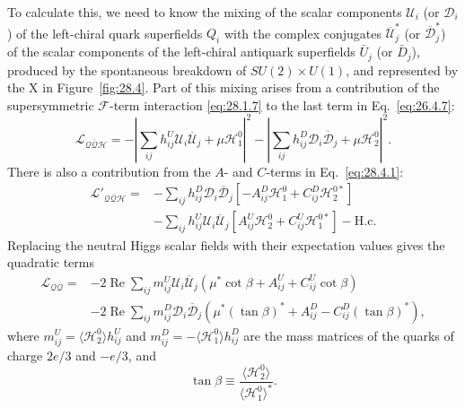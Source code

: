 To calculate this, we need to know the mixing of the scalar components
\(\mathcal{U}_i\) (or \(\mathcal{D}_i\)) of the left-chiral quark
superfields \(Q_i\) with the complex conjugates
\(\overline{\mathcal{U}}_j^*\) (or
\(\overline{\mathcal{D}}_j^*\)) of the scalar components of the
left-chiral antiquark superfields \(\bar U_j\) (or \(\bar D_j\)),
produced by the spontaneous breakdown of
\(SU(2)\times U(1)\), and represented by the X in
Figure~\ref{fig:28.4}. Part of this mixing arises from a contribution of
the supersymmetric \(\mathcal{F}\)-term interaction
\eqref{eq:28.1.7} to the last term in Eq.~\eqref{eq:26.4.7}:
\begin{equation}
  \mathcal{L}_{\mathcal{Q}\overline{\mathcal{Q}}\mathcal{H}}
  =
  -\left|
    \sum_{ij}h_{ij}^{U}\mathcal{U}_i\overline{\mathcal{U}}_j
    +\mu\mathcal{H}_1^0
  \right|^2
  -\left|
    \sum_{ij}h_{ij}^{D}\mathcal{D}_i\overline{\mathcal{D}}_j
    +\mu\mathcal{H}_2^0
  \right|^2.
  \tag{28.4.7}\label{eq:28.4.7}
\end{equation}
There is also a contribution from the \(A\)- and \(C\)-terms in
Eq.~\eqref{eq:28.4.1}:
\begin{equation}
  \begin{aligned}
  \mathcal{L}'_{\mathcal{Q}\overline{\mathcal{Q}}\mathcal{H}}
  ={}&
  -\sum_{ij}h_{ij}^{D}\mathcal{D}_i\overline{\mathcal{D}}_j
  \left[
    -A_{ij}^{D}\mathcal{H}_1^0+C_{ij}^{D}\mathcal{H}_2^{0*}
  \right]
  \\
  &-\sum_{ij}h_{ij}^{U}\mathcal{U}_i\overline{\mathcal{U}}_j
  \left[
    A_{ij}^{U}\mathcal{H}_2^0+C_{ij}^{U}\mathcal{H}_1^{0*}
  \right]
  -\mathrm{H.c.}
  \end{aligned}
  \tag{28.4.8}\label{eq:28.4.8}
\end{equation}
Replacing the neutral Higgs scalar fields with their expectation values
gives the quadratic terms
\begin{equation}
  \begin{aligned}
  \mathcal{L}_{\mathcal{Q}\overline{\mathcal{Q}}}
  ={}&
  -2\operatorname{Re}\sum_{ij}
    m_{ij}^{U}\mathcal{U}_i\overline{\mathcal{U}}_j
    \left(
      \mu^*\cot\beta+A_{ij}^{U}+C_{ij}^{U}\cot\beta
    \right)
  \\
  &-2\operatorname{Re}\sum_{ij}
    m_{ij}^{D}\mathcal{D}_i\overline{\mathcal{D}}_j
    \left(
      \mu^*(\tan\beta)^*+A_{ij}^{D}-C_{ij}^{D}(\tan\beta)^*
    \right),
  \end{aligned}
  \tag{28.4.9}\label{eq:28.4.9}
\end{equation}
where \(m_{ij}^{U}=\langle\mathcal{H}_2^0\rangle h_{ij}^{U}\) and
\(m_{ij}^{D}=-\langle\mathcal{H}_1^0\rangle h_{ij}^{D}\) are the mass
matrices of the quarks of charge \(2e/3\) and \(-e/3\), and
\begin{equation}
  \tan\beta\equiv
  \frac{\langle\mathcal{H}_2^0\rangle}
       {\langle\mathcal{H}_1^0\rangle^*}.
  \tag{28.4.10}\label{eq:28.4.10}
\end{equation}

